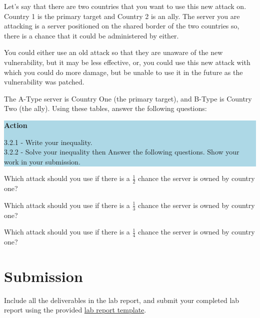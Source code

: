 \documentclass[letterpaper,12pt]{report}
\begin{document}
Let's say that there are two countries that you want to use this new attack on. Country 1 is the primary target and Country 2 is an ally. The server you are attacking is a server positioned on the shared border of the two countries so, there is a chance that it could be administered by either.

You could either use an old attack so that they are unaware of the new vulnerability, but it may be less effective, or, you could use this new attack with which you could do more damage, but be unable to use it in the future as the vulnerability was patched.

The A-Type server is Country One (the primary target), and B-Type is Country Two (the ally). Using these tables, answer the following questions:

\colorbox{lightblue}{%
\parbox{\dimexpr\linewidth-2\fboxsep}{%
\textbf{Action}

3.2.1 - Write your inequality.\\ 
3.2.2 - Solve your inequality then Answer the following questions. Show your work in your submission.\\
    }%
}%

\bigskip

\begin{mdframed}[backgroundcolor=black!10,style=code,nobreak=true,align=center,userdefinedwidth=14cm]
    Which attack should you use if there is a $\frac{1}{2}$ chance the server is owned by country one?

    Which attack should you use if there is a $\frac{1}{3}$ chance the server is owned by country one?

    Which attack should you use if there is a $\frac{1}{4}$ chance the server is owned by country one?
\end{mdframed}


\section*{Submission}\label{sec:Submission}

Include all the deliverables in the lab report, and submit your completed lab report using the provided \href{https://docs.google.com/document/d/1f_rB22EzL8aezExZ7jYFARnuy5xuhcwC/edit?usp=sharing&ouid=113481593569562690929&rtpof=true&sd=true}{lab report template}. 
\end{document}
